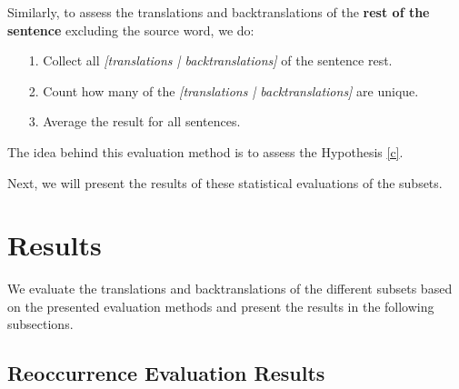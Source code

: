 Similarly, to assess the translations and backtranslations of the \textbf{rest of the sentence} excluding the source word, we do:
\begin{enumerate}
    \item[1. ] Collect all \textit{[translations | backtranslations]} of the sentence rest.
    \item[2. ] Count how many of the \textit{[translations | backtranslations]} are unique.
    \item[3. ] Average the result for all sentences.
\end{enumerate}

The idea behind this evaluation method is to assess the Hypothesis \ref{c}.

Next, we will present the results of these statistical evaluations of the subsets.

\section{Results}
\label{ch:Base_Experiment:Results}


We evaluate the translations and backtranslations of the different subsets based on the presented evaluation methods and present the results in the following subsections.

\subsection{Reoccurrence Evaluation Results}
\label{ch:Base_Experiment:Results:Reoccurrence}

